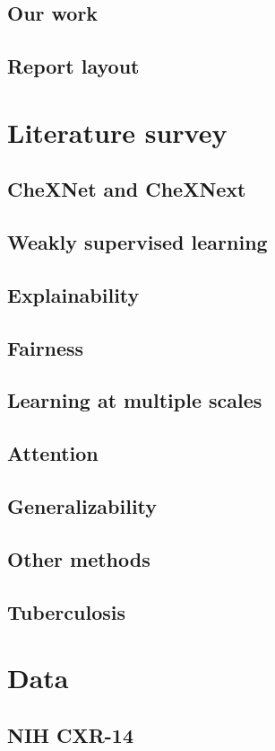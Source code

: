 \documentclass[11pt,twoside,a4paper]{report}
\begin{document}
    \section{Our work}
    \section{Report layout}
\chapter{Literature survey}
    \section{CheXNet and CheXNext}
    \section{Weakly supervised learning}
    \section{Explainability}
    \section{Fairness}
    \section{Learning at multiple scales}
    \section{Attention}
    \section{Generalizability}
    \section{Other methods}
    \section{Tuberculosis}
\chapter{Data}
    \section{NIH CXR-14}
\end{document}
